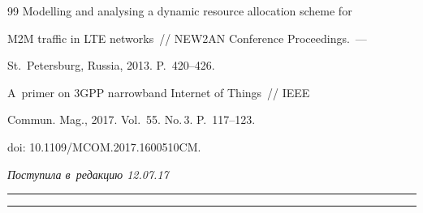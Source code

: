 {{\begin{thebibliography}{99}
Modelling and analysing a dynamic resource allocation scheme for 


M2M traffic in LTE networks~/\!\!/ NEW2AN Conference Proceedings.~---


St.\ Petersburg, Russia, 2013. P.~420--426.


    






A~primer on 3GPP narrowband Internet of Things~/\!\!/ IEEE 


Commun. Mag., 2017. Vol.~55. No.\,3. P.~117--123.


doi: 10.1109\!/\!MCOM.2017.1600510CM.


        \end{thebibliography}


} }








\vspace*{-3pt}





\hfill{\small\textit{Поступила в~редакцию 12.07.17}}














\vspace*{4pt}





\hrule





\vspace*{2pt}















\hrule





